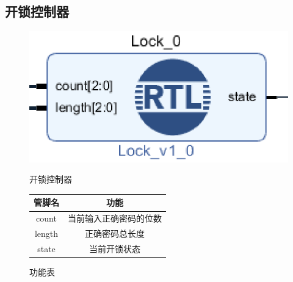 \documentclass[a4paper,11pt]{ctexart}
\begin{document}
\subsection{开锁控制器}
\begin{figure}[htb]
  \begin{minipage}[b]{0.5\textwidth}
    \centering
    \includegraphics{./images/Lock.eps}
    \caption{开锁控制器}
    \label{fig:by:table}
  \end{minipage}%
  \begin{minipage}[b]{0.5\textwidth}
    \centering
    \begin{tabular}{|c|c|} \hline
      管脚名 & 功能 \\ \hline\hline
      count     &   当前输入正确密码的位数 \\
      length    &   正确密码总长度 \\
      state     & 当前开锁状态 \\ \hline
    \end{tabular}
    \caption{功能表}
    \label{table:by:fig}
  \end{minipage}
\end{figure}
\end{document}
